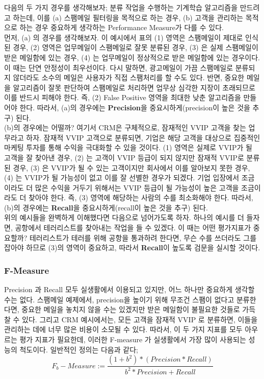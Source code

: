 \documentclass[a4paper]{oblivoir}
\begin{document}
\indent 다음의 두 가지 경우를 생각해보자; 분류 작업을 수행하는 기계학습 알고리즘을 만드려고 하는데, 이를 (a) 스팸메일 필터링을 목적으로 하는 경우, (b) 고객을 관리하는 목적으로 하는 경우 중요하게 생각하는 Performance Measure가 다를 수 있다. \\
\indent 먼저, (a) 의 경우를 생각해보자. 이 예시에서 표의 (1) 영역은 스팸메일이 제대로 인식된 경우, (2) 영역은 업무메일이 스팸메일로 잘못 분류된 경우, (3) 은 실제 스팸메일이 받은 메일함에 있는 경우, (4) 는 업무메일이 정상적으로 받은 메일함에 있는 경우이다. 이 때는 단연 안정성이 최우선이다. 다시 말하면, 광고메일이 가끔 스팸메일로 분류되지 않더라도 소수의 메일은 사용자가 직접 스팸처리를 할 수도 있다. 반면, 중요한 메일을 알고리즘이 잘못 판단하여 스팸메일로 처리하면 업무상 심각한 지장이 초래되므로 이를 반드시 피해야 한다. 즉, (2) False Positive 영역을 최대한 낮춘 알고리즘을 만들어야 한다. 따라서, (a)의 경우에는 \textbf{Precision}을 중요시하게(precision이 높은 것을 추구) 된다. \\
\indent (b)의 경우에는 어떨까? 여기서 CRM은 구체적으로, 잠재적인 VVIP 고객을 찾는 업무라고 하자. 잠재적 VVIP 고객으로 분류되면, 기업은 해당 고객을 대상으로 집중적인 마케팅 투자를 통해 수익을 극대화할 수 있을 것이다. (1) 영역은 실제로 VVIP가 될 고객을 잘 찾아낸 경우, (2) 는 고객이 VVIP 등급이 되지 않지만 잠재적 VVIP로 분류된 경우, (3) 은 VVIP가 될 수 있는 고객이지만 회사에서 이를 알아보지 못한 경우, (4) 는 VVIP가 될 가능성이 없고 이를 잘 선별한 경우가 되겠다. 기업 입장에서 조금이라도 더 많은 수익을 거두기 위해서는 VVIP 등급이 될 가능성이 높은 고객을 조금이라도 더 찾아야 한다. 즉, (3) 영역에 해당하는 사람의 수를 최소화해야 한다. 따라서, (b)의 경우에는 \textbf{Recall}을 중요시하게(recall이 높은 것을 추구) 된다. \\
\indent 위의 예시들을 완벽하게 이해했다면 다음으로 넘어가도록 하자. 하나의 예시를 더 들자면, 공항에서 테러리스트를 찾아내는 작업을 들 수 있겠다. 이 때는 어떤 평가지표가 중요할까? 테러리스트가 테러를 위해 공항을 통과하려 한다면, 무슨 수를 쓰더라도 그를 잡아야 하므로 (3)의 영역이 중요하고, 따라서 \textbf{Recall}이 높도록 검문을 실시할 것이다.

\subsubsection{F-Measure}
Precision 과 Recall 모두 실생활에서 이용되고 있지만, 어느 하나만 중요하게 생각할 수는 없다. 스팸메일 예제에서, precision을 높이기 위해 무조건 스팸이 없다고 분류한다면, 중요한 메일을 놓치지 않을 수는 있겠지만 받은 메일함이 불필요한 것들로 가득찰 수 있다. 그리고 CRM 예시에서는, 모든 고객을 잠재적 VVIP 로 분류하면, 이들을 관리하는 데에 너무 많은 비용이 소모될 수 있다. 따라서, 이 두 가지 지표를 모두 아우르는 평가 지표가 필요한데, 이러한 F-measure 가 실생활에서 가장 많이 사용되는 성능의 척도이다. 일반적인 정의는 다음과 같다;
\begin{equation}
F_{b}-Measure := \dfrac{(1+b^{2})*(Precision*Recall)}{b^{2}*Precision + Recall} \tag{6-11}
\end{equation}
\end{document}
